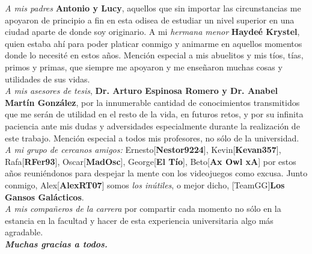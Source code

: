 \documentclass[
11pt, %
spanish, %
singlespacing, %
headsepline, %
]{MastersDoctoralThesis} %
\begin{document}
\begin{acknowledgements}
\addchaptertocentry{\acknowledgementname} %
\textit{A mis padres} \textbf{Antonio y Lucy}, aquellos que sin importar las circunstancias me apoyaron de principio a fin en esta odisea de estudiar un nivel superior en una ciudad aparte de donde soy originario. A mi \textit{hermana menor} \textbf{Haydeé Krystel}, quien estaba ahí para poder platicar conmigo y animarme en aquellos momentos donde lo necesité en estos años. Mención especial a mis abuelitos y mis tíos, tías, primos y primas, que siempre me apoyaron y me enseñaron muchas cosas y utilidades de sus vidas. \\

\textit{A mis asesores de tesis}, \textbf{Dr. Arturo Espinosa Romero y Dr. Anabel Martín González}, por la innumerable cantidad de conocimientos transmitidos que me serán de utilidad en el resto de la vida, en futuros retos, y por su infinita paciencia ante mis dudas y adversidades especialmente durante la realización de este trabajo. Mención especial a todos mis profesores, no sólo de la universidad. \\

\textit{A mi grupo de cercanos amigos:} Ernesto[\textbf{Nestor9224}], Kevin[\textbf{Kevan357}], Rafa[\textbf{RFer93}], Oscar[\textbf{MadOsc}], George[\textbf{El Tío}], Beto[\textbf{Ax Owl xA}] por estos años reuniéndonos para despejar la mente con los videojuegos como excusa. Junto conmigo, Alex[\textbf{AlexRT07}] somos \textit{los inútiles}, o mejor dicho, [TeamGG]\textbf{Los Gansos Galácticos}. \\

\textit{A mis compañeros de la carrera} por compartir cada momento no sólo en la estancia en la facultad y hacer de esta experiencia universitaria algo más agradable. \\

\textbf{\textit{\Large Muchas gracias a todos.}}

\end{acknowledgements} 

\tableofcontents %

\listoffigures %

\listoftables %
\end{document}
